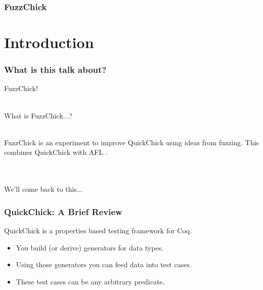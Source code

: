 \documentclass{beamer}
\author{
  Beck, Calvin \and Huang, Jiani \and Li, Yishuai
}
\begin{document}
\begin{frame}
  \frametitle{FuzzChick}
  \maketitle
\end{frame}

\section{Introduction}

\begin{frame}
  \frametitle{What is this talk about?}

  \pause

  {\huge FuzzChick!}\\~\\

  \pause

  What is FuzzChick...? \\~\\

  \pause

  FuzzChick is an experiment to improve QuickChick using ideas from
  fuzzing. This combines QuickChick with AFL \cite{AFL}.\\~\\~\\

  \pause

  {\huge We'll come back to this...}\\

\end{frame}

\begin{frame}
  \frametitle{QuickChick: A Brief Review}

  QuickChick is a properties based testing framework for Coq. \\

  \begin{itemize}
  \item You build (or derive) generators for data types.
  \item Using those generators you can feed data into test cases.
  \item These test cases can be any arbitrary predicate.
  \end{itemize}
\end{frame}
\end{document}
